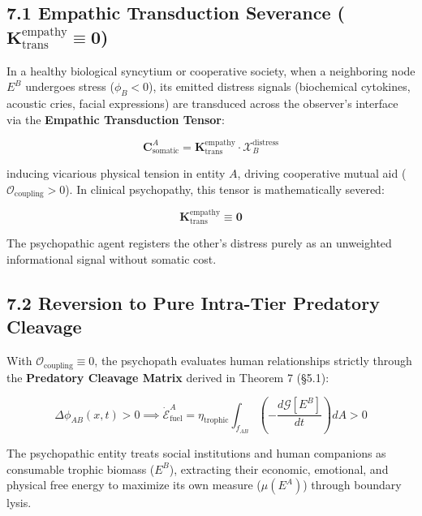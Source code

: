 \documentclass[11pt,a4paper]{article}
\theoremstyle{definition}
\theoremstyle{remark}
\begin{document}
\subsection{7.1 Empathic Transduction Severance ($\mathbf{K}_{\text{trans}}^{\text{empathy}} \equiv \mathbf{0}$)}
In a healthy biological syncytium or cooperative society, when a neighboring node $E^B$ undergoes stress ($\phi_B < 0$), its emitted distress signals (biochemical cytokines, acoustic cries, facial expressions) are transduced across the observer's interface via the \textbf{Empathic Transduction Tensor}:

\begin{equation}
\mathbf{C}_{\text{somatic}}^A = \mathbf{K}_{\text{trans}}^{\text{empathy}} \cdot \boldsymbol{\mathcal{X}}_B^{\text{distress}}
\end{equation}

inducing vicarious physical tension in entity $A$, driving cooperative mutual aid ($\mathcal{O}_{\text{coupling}} > 0$). In clinical psychopathy, this tensor is mathematically severed:

\begin{equation}
\mathbf{K}_{\text{trans}}^{\text{empathy}} \equiv \mathbf{0}
\end{equation}

The psychopathic agent registers the other's distress purely as an unweighted informational signal without somatic cost.

\subsection{7.2 Reversion to Pure Intra-Tier Predatory Cleavage}
With $\mathcal{O}_{\text{coupling}} \equiv 0$, the psychopath evaluates human relationships strictly through the \textbf{Predatory Cleavage Matrix} derived in Theorem 7 (§5.1):

\begin{equation}
\Delta \phi_{AB}(x, t) > 0 \implies \dot{\mathcal{E}}_{\text{fuel}}^A = \eta_{\text{trophic}} \int_{f_{AB}} \left( -\frac{d\mathcal{G}[E^B]}{dt} \right) dA > 0
\end{equation}

The psychopathic entity treats social institutions and human companions as consumable trophic biomass ($E^B$), extracting their economic, emotional, and physical free energy to maximize its own measure ($\mu(E^A)$) through boundary lysis.
\end{document}
